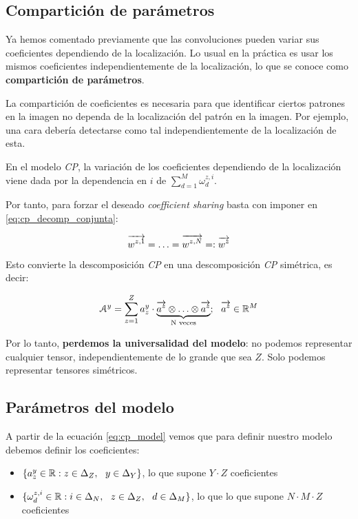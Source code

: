 \subsection{Compartición de parámetros} \label{subs:comparticion_parametros_cp}

Ya hemos comentado previamente que las convoluciones pueden variar sus coeficientes dependiendo de la localización. Lo usual en la práctica es usar los mismos coeficientes independientemente de la localización, lo que se conoce como \textbf{compartición de parámetros}.

La compartición de coeficientes es necesaria para que identificar ciertos patrones en la imagen no dependa de la localización del patrón en la imagen. Por ejemplo, una cara debería detectarse como tal independientemente de la localización de esta.

En el modelo \textit{CP}, la variación de los coeficientes dependiendo de la localización viene dada por la dependencia en $i$ de $\sum_{d = 1}^M \omega_d^{z ,i}$.

Por tanto, para forzar el deseado \textit{coefficient sharing} basta con imponer en \eqref{eq:cp_decomp_conjunta}:

\begin{equation}
    \overrightarrow{w^{z, 1}} = \ldots = \overrightarrow{w^{z, N}} =: \overrightarrow{w^z}
\end{equation}

Esto convierte la descomposición \textit{CP} en una descomposición \textit{CP} simétrica, es decir:

\begin{equation}
    \mathcal{A}^y = \sum_{z = 1}^Z a_z^y \cdot \underbrace{\overrightarrow{a^z} \otimes \ldots \otimes \overrightarrow{a^z}}_\textrm{N veces}; \ \  \overrightarrow{a^z} \in \mathbb{R}^M
\end{equation}

Por lo tanto, \textbf{perdemos la universalidad del modelo}: no podemos representar cualquier tensor, independientemente de lo grande que sea $Z$. Solo podemos representar tensores simétricos.

\subsection{Parámetros del modelo} \label{msubsec:parametros_modelo_cp}

A partir de la ecuación \eqref{eq:cp_model} vemos que para definir nuestro modelo debemos definir los coeficientes:

\begin{itemize}
    \item $\{a_z^y \in \mathbb{R} : z \in \Delta_{Z}, \ \  y \in \Delta_{Y}\}$, lo que supone $Y \cdot Z$ coeficientes
    \item $\{\omega_d^{z, i} \in \mathbb{R}: i \in \Delta_{N}, \ \  z \in \Delta_{Z}, \ \  d \in \Delta_{M}\}$, lo que lo que supone $N \cdot M \cdot Z$ coeficientes
\end{itemize}

